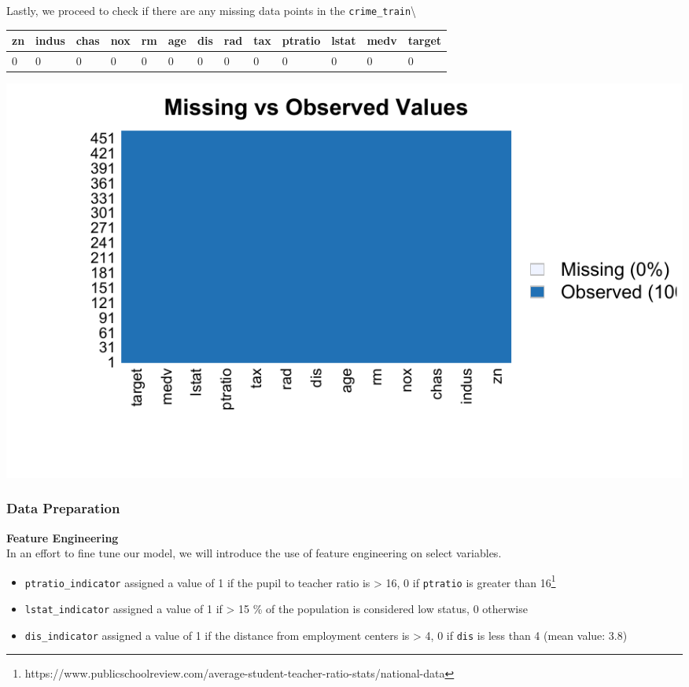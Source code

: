 \documentclass[3p]{elsarticle} %
\providecommand{\tightlist}{%
  \setlength{\itemsep}{0pt}\setlength{\parskip}{0pt}}
\begin{document}
\newpage

Lastly, we proceed to check if there are any missing data points in the
\texttt{crime\_train}\textbackslash{}

\begin{tabular}{l|l|l|l|l|l|l|l|l|l|l|l|l}
\hline
zn & indus & chas & nox & rm & age & dis & rad & tax & ptratio & lstat & medv & target\\
\hline
0 & 0 & 0 & 0 & 0 & 0 & 0 & 0 & 0 & 0 & 0 & 0 & 0\\
\hline
\end{tabular}

\includegraphics{paper_files/figure-latex/missing-values-1.pdf}

\newpage

\hypertarget{data-preparation}{%
\subsubsection{Data Preparation}\label{data-preparation}}

\textbf{Feature Engineering}\\
In an effort to fine tune our model, we will introduce the use of
feature engineering on select variables.

\begin{itemize}
\tightlist
\item
  \texttt{ptratio\_indicator} assigned a value of 1 if the pupil to
  teacher ratio is \textgreater{} 16, 0 if \texttt{ptratio} is greater
  than 16\footnote{https://www.publicschoolreview.com/average-student-teacher-ratio-stats/national-data}\\
\item
  \texttt{lstat\_indicator} assigned a value of 1 if \textgreater{} 15
  \% of the population is considered low status, 0 otherwise
\item
  \texttt{dis\_indicator} assigned a value of 1 if the distance from
  employment centers is \textgreater{} 4, 0 if \texttt{dis} is less than
  4 (mean value: 3.8)
\end{itemize}
\end{document}
